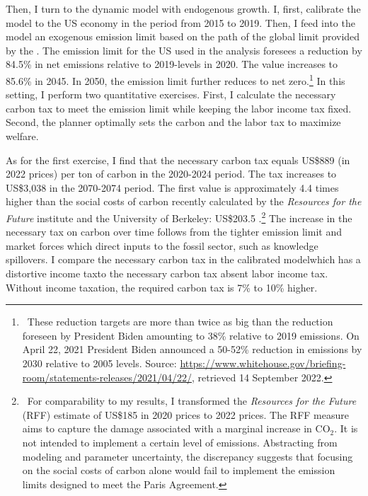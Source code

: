 Then, I turn to the dynamic model with endogenous growth. I, first, calibrate the model to the US economy in the period from 2015 to 2019. Then, I feed into the model an exogenous emission limit based on the path of the global limit provided by the \cite{IPCC2022}. The emission limit for the US used in the analysis foresees a reduction by 84.5\% in net emissions relative to 2019-levels in 2020. The value increases to 85.6\% in 2045. In 2050, the emission limit further reduces to net zero.\footnote{\  These reduction targets are more than twice as big than the reduction foreseen by President Biden amounting to 38\% relative to 2019 emissions. On April 22, 2021 President Biden announced a 50-52\% reduction in emissions by 2030 relative to 2005 levels. Source:  \href{https://www.whitehouse.gov/briefing-room/statements-releases/2021/04/22/fact-sheet-president-biden-sets-2030-greenhouse-gas-pollution-reduction-target-aimed-at-creating-good-paying-union-jobs-and-securing-u-s-leadership-on-clean-energy-technologies/}{https://www.whitehouse.gov/briefing-room/statements-releases/2021/04/22/}, retrieved 14 September 2022.}
 In this setting, I perform two quantitative exercises. First, I calculate the necessary carbon tax to meet the emission limit while keeping the labor income tax fixed. Second,  the planner optimally sets the carbon and the labor tax to maximize welfare.

As for the first exercise, I find that the necessary carbon tax equals US\$889 (in 2022 prices) per ton of carbon in the 2020-2024 period. The tax increases to US\$3,038 in the 2070-2074 period. The first value is approximately 4.4 times higher than the social costs of carbon recently calculated by the \textit{Resources for the Future} institute and the University of Berkeley: US\$203.5 \citep{Rennert2022ComprehensiveCO2}.\footnote{\  For comparability to my results, I transformed the \textit{Resources for the Future} (RFF) estimate of US\$185 in 2020 prices to 2022 prices. The RFF measure aims to capture the damage associated with a marginal increase in CO$_2$. It is not intended to implement a certain level of emissions. Abstracting from modeling and parameter uncertainty, the discrepancy suggests that focusing on the social costs of carbon alone would fail to implement the emission limits designed to meet the Paris Agreement. } 
The  increase in the necessary tax on carbon over time follows from the tighter emission limit and market forces which direct inputs to the fossil sector, such as knowledge spillovers. I compare the necessary carbon tax in the calibrated model\textemdash which has a distortive income tax\textemdash to the necessary carbon tax absent labor income tax. Without income taxation, the required carbon tax is  7\% to 10\% higher.

